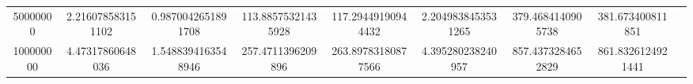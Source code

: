 \begin{table}[ht]
{\begin{tabular}{@{}S[table-format=9]SSSSSSSS@{}}
            50000000            & 2.216078583151102   & 0.9870042651891708 & 113.88575321435928 & 117.29449190944432 & 2.2049838453531265 & 379.4684140905738  & 381.673400811851   \\
            100000000           & 4.47317860648036    & 1.5488394163548946 & 257.4711396209896  & 263.89783180877566 & 4.395280238240957  & 857.4373284652829  & 861.8326124921441  \\
            \bottomrule
        \end{tabular}\label{table:efficiency_parquet-70percent}
    }
\end{table}